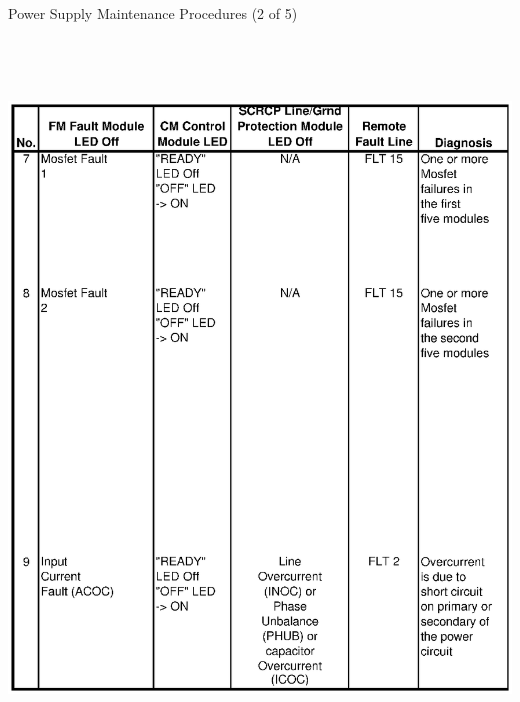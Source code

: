 \clearpage
\begin{table}
\caption{Power Supply Maintenance Procedures (2 of 5) \label{tab:ps_maint_2}}
\includegraphics[height=7.5in,width=6.2in]{book2.ps}
\end{table}

